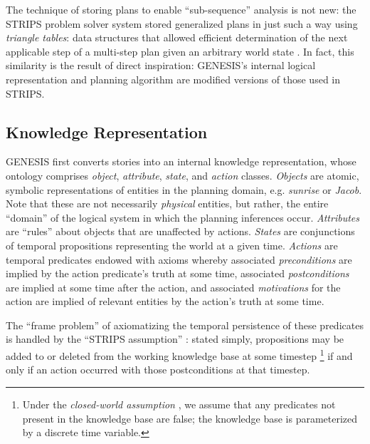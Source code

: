 The technique of storing plans to enable ``sub-sequence'' analysis is not new: the STRIPS problem solver system stored generalized plans in just such a way using \textit{triangle tables}: data structures that allowed efficient determination of the next applicable step of a multi-step plan given an arbitrary world state \citep{fikes1972}. In fact, this similarity is the result of direct inspiration: GENESIS's internal logical representation and planning algorithm are modified versions of those used in STRIPS.

\subsection{Knowledge Representation}

GENESIS first converts stories into an internal knowledge representation, whose ontology comprises \textit{object}, \textit{attribute}, \textit{state}, and \textit{action} classes. \textit{Objects} are atomic, symbolic representations of entities in the planning domain, e.g. \textit{sunrise} or \textit{Jacob}. Note that these are not necessarily \textit{physical} entities, but rather, the entire ``domain'' of the logical system in which the planning inferences occur. \textit{Attributes} are ``rules'' about objects that are unaffected by actions. \textit{States} are conjunctions of temporal propositions representing the world at a given time. \textit{Actions} are temporal predicates endowed with axioms whereby associated \textit{preconditions} are implied by the action predicate's truth at some time, associated \textit{postconditions} are implied at some time after the action, and associated \textit{motivations} for the action are implied of relevant entities by the action's truth at some time.

The ``frame problem'' \citep{mccarthy69} of axiomatizing the temporal persistence of these predicates is handled by the ``STRIPS assumption'' \citep{fikes1972}: stated simply, propositions may be added to or deleted from the working knowledge base at some timestep \footnote{Under the \textit{closed-world assumption} \citep{Reiter:1987:CWD:42641.42663}, we assume that any predicates not present in the knowledge base are false; the knowledge base is parameterized by a discrete time variable.} if and only if an action occurred with those postconditions at that timestep.

